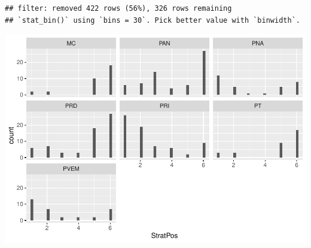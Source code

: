 \documentclass[]{article}
\newenvironment{Shaded}{\begin{snugshade}}{\end{snugshade}}
\newcommand{\DecValTok}[1]{\textcolor[rgb]{0.00,0.00,0.81}{#1}}
\newcommand{\KeywordTok}[1]{\textcolor[rgb]{0.13,0.29,0.53}{\textbf{#1}}}
\newcommand{\NormalTok}[1]{#1}
\newcommand{\OperatorTok}[1]{\textcolor[rgb]{0.81,0.36,0.00}{\textbf{#1}}}
\newcommand{\StringTok}[1]{\textcolor[rgb]{0.31,0.60,0.02}{#1}}
\begin{document}
\begin{Shaded}
\end{Shaded}

\begin{verbatim}
## filter: removed 422 rows (56%), 326 rows remaining
## `stat_bin()` using `bins = 30`. Pick better value with `binwidth`.
\end{verbatim}

\includegraphics{ProposalAnalysis_files/figure-latex/unnamed-chunk-9-2.pdf}

\begin{Shaded}
\end{Shaded}
\end{document}
